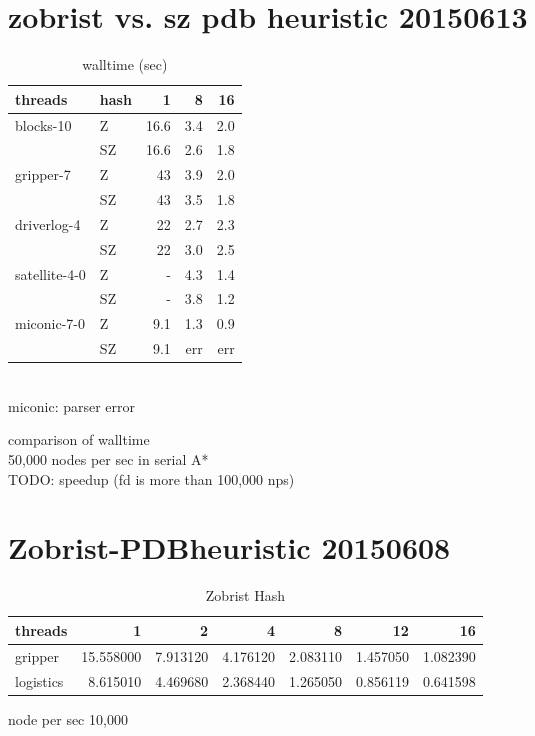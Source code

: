 \documentclass[uplatex]{article}
\begin{document}
\section{zobrist vs. sz pdb heuristic 20150613}
\begin{table}[h]
	\caption{walltime (sec)}
	\centering
	\begin{tabular}{llrrr} \hline
		threads       & hash & 1    & 8   & 16 \\ \hline
		blocks-10     & Z    & 16.6 & 3.4 & 2.0 \\
		              & SZ   & 16.6 & 2.6 & 1.8 \\
		gripper-7     & Z    & 43   & 3.9 & 2.0 \\
		              & SZ   & 43   & 3.5 & 1.8 \\
		driverlog-4   & Z    & 22   & 2.7 & 2.3 \\
		              & SZ   & 22   & 3.0 & 2.5 \\
		satellite-4-0 & Z    & -    & 4.3 & 1.4 \\
		              & SZ   & -    & 3.8 & 1.2 \\
		miconic-7-0   & Z    & 9.1  & 1.3 & 0.9 \\
		              & SZ   & 9.1  & err & err \\
	\end{tabular}
	\\
	miconic: parser error
\end{table}

comparison of walltime \\
50,000 nodes per sec in serial A*\\
TODO: speedup (fd is more than 100,000 nps)


\section{Zobrist-PDBheuristic 20150608}
\begin{table}[h]
	\caption{Zobrist Hash}
	\centering
	\begin{tabular}{lrrrrrr} \hline
		threads & 1 & 2 & 4 & 8 & 12 & 16 \\ \hline
		gripper & 15.558000 & 7.913120 & 4.176120 & 2.083110 & 1.457050 & 1.082390 \\
		logistics & 8.615010 & 4.469680 & 2.368440 & 1.265050 & 0.856119 & 0.641598

	\end{tabular}
	node per sec 10,000
\end{table}
\end{document}
